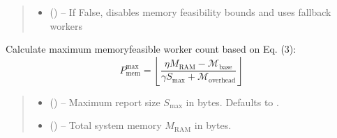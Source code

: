 \documentclass[a4paper,11pt,english,openany,oneside]{sphinxmanual}
\begin{document}
\begin{fulllineitems}
\begin{fulllineitems}
\begin{quote}
\begin{description}
\begin{itemize}
\item {} 
\sphinxAtStartPar
{} () – If False, disables memory feasibility bounds and uses fallback workers

\end{itemize}

\end{description}\end{quote}

\end{fulllineitems}


\begin{fulllineitems}
\label{\detokenize{modules/core:core.resource_manager.ResourceManager.get_memory_feasible_workers}}
\pysigstartsignatures
\pysiglinewithargsret
{}
{\sphinxparamcomma {}\sphinxparamcomma {}}
{}
\pysigstopsignatures
\sphinxAtStartPar
Calculate maximum memory\sphinxhyphen{}feasible worker count based on Eq. (3):
\begin{equation*}
P_{\mathrm{mem}}^{\max} = \left\lfloor \frac{\eta M_{\mathrm{RAM}} - \mathcal{M}_{\mathrm{base}}}{\gamma S_{\max} + \mathcal{M}_{\mathrm{overhead}}} \right\rfloor
\end{equation*}
\begin{quote}\begin{description}
\begin{itemize}
\item {} 
\sphinxAtStartPar
{} (\sphinxstyleliteralemphasis{\sphinxupquote{ | }}) – Maximum report size $S_{\max}$ in bytes. Defaults to .

\item {} 
\sphinxAtStartPar
{} (\sphinxstyleliteralemphasis{\sphinxupquote{ | }}) – Total system memory $M_{\mathrm{RAM}}$ in bytes.


\end{itemize}
\end{description}
\end{quote}
\end{fulllineitems}
\end{fulllineitems}
\end{document}
